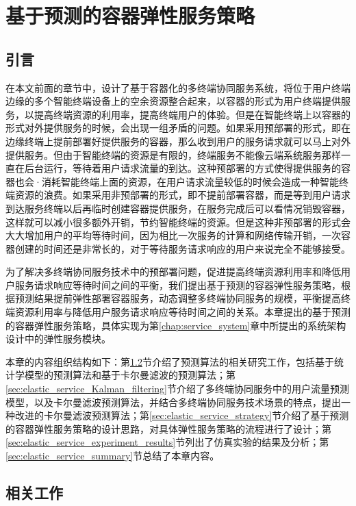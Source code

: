 \chapter{基于预测的容器弹性服务策略 }\label{chap:elastic_service}

\section{引言}

在本文前面的章节中，设计了基于容器化的多终端协同服务系统，将位于用户终端边缘的多个智能终端设备上的空余资源整合起来，以容器的形式为用户终端提供服务，以提高终端资源的利用率，提高终端用户的体验。但是在智能终端上以容器的形式对外提供服务的时候，会出现一组矛盾的问题。如果采用预部署的形式，即在边缘终端上提前部署好提供服务的容器，那么收到用户的服务请求就可以马上对外提供服务。但由于智能终端的资源是有限的，终端服务不能像云端系统服务那样一直在后台运行，等待着用户请求流量的到达。这种预部署的方式使得提供服务的容器也会·消耗智能终端上面的资源，在用户请求流量较低的时候会造成一种智能终端资源的浪费。如果采用非预部署的形式，即不提前部署容器，而是等到用户请求到达服务终端以后再临时创建容器提供服务，在服务完成后可以看情况销毁容器，这样就可以减小很多额外开销，节约智能终端的资源。但是这种非预部署的形式会大大增加用户的平均等待时间，因为相比一次服务的计算和网络传输开销，一次容器创建的时间还是非常长的，对于等待服务请求响应的用户来说完全不能够接受。

为了解决多终端协同服务技术中的预部署问题，促进提高终端资源利用率和降低用户服务请求响应等待时间之间的平衡，我们提出基于预测的容器弹性服务策略，根据预测结果提前弹性部署容器服务，动态调整多终端协同服务的规模，平衡提高终端资源利用率与降低用户服务请求响应等待时间之间的关系。本章提出的基于预测的容器弹性服务策略，具体实现为第\ref{chap:service_system}章中所提出的系统架构设计中的弹性服务模块。

本章的内容组织结构如下：第\ref{sec:elastic_service_related_work}节介绍了预测算法的相关研究工作，包括基于统计学模型的预测算法和基于卡尔曼滤波的预测算法；第\ref{sec:elastic_service_Kalman_filtering}节介绍了多终端协同服务中的用户流量预测模型，以及卡尔曼滤波预测算法，并结合多终端协同服务技术场景的特点，提出一种改进的卡尔曼滤波预测算法；第\ref{sec:elastic_service_strategy}节介绍了基于预测的容器弹性服务策略的设计思路，对具体弹性服务策略的流程进行了设计；第\ref{sec:elastic_service_experiment_results}节列出了仿真实验的结果及分析；第\ref{sec:elastic_service_summary}节总结了本章内容。

\section{相关工作}\label{sec:elastic_service_related_work}

